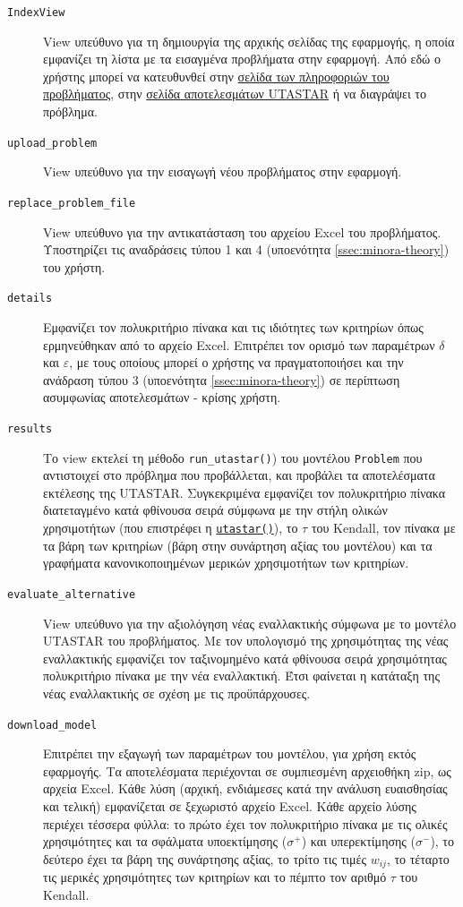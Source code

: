 \documentclass[11pt,a4paper,titlepage]{article}
\numberwithin{equation}{section}
\begin{document}
\begin{description}
\item[\hypertarget{IndexView}{\texttt{IndexView}}] View υπεύθυνο για τη δημιουργία της αρχικής σελίδας της εφαρμογής, η 
οποία εμφανίζει τη λίστα με τα εισαγμένα προβλήματα στην εφαρμογή. Από εδώ ο χρήστης μπορεί να
κατευθυνθεί στην \hyperlink{details}{σελίδα των πληροφοριών του προβλήματος}, στην \hyperlink{results}{σελίδα αποτελεσμάτων UTASTAR} ή να διαγράψει το πρόβλημα.
\item[\hypertarget{uploadproblem}{\texttt{upload\_problem}}] View υπεύθυνο για την εισαγωγή νέου προβλήματος στην εφαρμογή.
\item[\hypertarget{replaceproblemfile}{\texttt{replace\_problem\_file}}] View υπεύθυνο για την αντικατάσταση του αρχείου Excel του προβλήματος. Υποστηρίζει τις αναδράσεις τύπου 1 και 4 (υποενότητα \ref{ssec:minora-theory}) του χρήστη.
\item[\hypertarget{details}{\texttt{details}}] Εμφανίζει τον πολυκριτήριο πίνακα και τις ιδιότητες των κριτηρίων όπως ερμηνεύθηκαν από το αρχείο Excel. Επιτρέπει τον ορισμό των παραμέτρων $ \delta $ και $ \varepsilon $, με τους οποίους μπορεί ο χρήστης να πραγματοποιήσει και την ανάδραση τύπου 3 (υποενότητα \ref{ssec:minora-theory}) σε περίπτωση ασυμφωνίας αποτελεσμάτων - κρίσης χρήστη.
\item[\hypertarget{results}{\texttt{results}}] Το view εκτελεί τη μέθοδο \texttt{run\_utastar()}) του μοντέλου \texttt{Problem} που αντιστοιχεί στο πρόβλημα που προβάλλεται, και προβάλει τα αποτελέσματα εκτέλεσης της UTASTAR. Συγκεκριμένα εμφανίζει τον πολυκριτήριο πίνακα διατεταγμένο κατά φθίνουσα σειρά σύμφωνα με την στήλη ολικών χρησιμοτήτων (που επιστρέφει η \hyperref[sssec:utastar()]{\texttt{utastar()}}), το $ \tau $ του Kendall, τον πίνακα με τα βάρη των κριτηρίων (βάρη στην συνάρτηση αξίας του μοντέλου) και τα γραφήματα κανονικοποιημένων μερικών χρησιμοτήτων των κριτηρίων.
\item[\hypertarget{evaluatealternative}{\texttt{evaluate\_alternative}}] View υπεύθυνο για την αξιολόγηση νέας εναλλακτικής σύμφωνα με το μοντέλο UTASTAR του προβλήματος. Με τον υπολογισμό της χρησιμότητας της νέας εναλλακτικής εμφανίζει τον ταξινομημένο κατά φθίνουσα σειρά χρησιμότητας πολυκριτήριο πίνακα με την νέα εναλλακτική. Έτσι φαίνεται η κατάταξη της νέας εναλλακτικής σε σχέση με τις προϋπάρχουσες.
\item[\hypertarget{downloadmodel}{\texttt{download\_model}}] Επιτρέπει την εξαγωγή των παραμέτρων του μοντέλου, για χρήση εκτός εφαρμογής. Τα αποτελέσματα περιέχονται σε συμπιεσμένη αρχειοθήκη zip, ως αρχεία Excel. Κάθε λύση (αρχική, ενδιάμεσες κατά την ανάλυση ευαισθησίας και τελική) εμφανίζεται σε ξεχωριστό αρχείο Excel. Κάθε αρχείο λύσης περιέχει τέσσερα φύλλα: το πρώτο έχει τον πολυκριτήριο πίνακα με τις ολικές χρησιμότητες και τα σφάλματα υποεκτίμησης ($ \sigma^{+} $) και υπερεκτίμησης ($ \sigma^{-} $), το δεύτερο έχει τα βάρη της συνάρτησης αξίας, το τρίτο τις τιμές $ w_{ij} $, το τέταρτο τις μερικές χρησιμότητες των κριτηρίων και το πέμπτο τον αριθμό $ \tau $ του Kendall.

\end{description}
\end{document}
